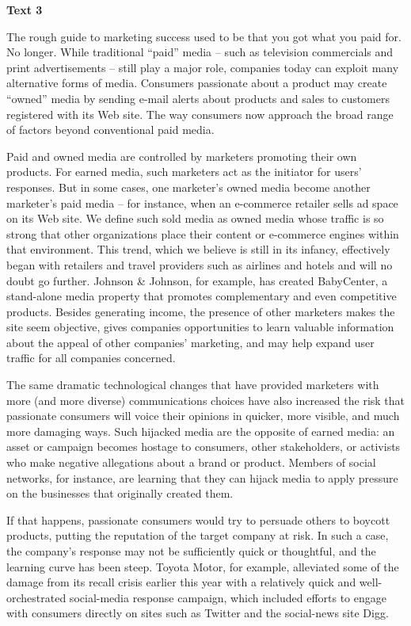 \begin{center}\textbf{Text 3}\end{center}

The rough guide to marketing success used to be that you got what you paid for. No longer. While traditional ``paid'' media – such as television commercials and print advertisements – still play a major role, companies today can exploit many alternative forms of media. Consumers passionate about a product may create ``owned'' media by sending e-mail alerts about products and sales to customers registered with its Web site. The way consumers now approach the broad range of factors beyond conventional paid media.

Paid and owned media are controlled by marketers promoting their own products. For earned media, such marketers act as the initiator for users' responses. But in some cases, one marketer's owned media become another marketer's paid media – for instance, when an e-commerce retailer sells ad space on its Web site. We define such sold media as owned media whose traffic is so strong that other organizations place their content or e-commerce engines within that environment. This trend, which we believe is still in its infancy, effectively began with retailers and travel providers such as airlines and hotels and will no doubt go further. Johnson \& Johnson, for example, has created BabyCenter, a stand-alone media property that promotes complementary and even competitive products. Besides generating income, the presence of other marketers makes the site seem objective, gives companies opportunities to learn valuable information about the appeal of other companies' marketing, and may help expand user traffic for all companies concerned. 

The same dramatic technological changes that have provided marketers with more (and more diverse) communications choices have also increased the risk that passionate consumers will voice their opinions in quicker, more visible, and much more damaging ways. Such hijacked media are the opposite of earned media: an asset or campaign becomes hostage to consumers, other stakeholders, or activists who make negative allegations about a brand or product. Members of social networks, for instance, are learning that they can hijack media to apply pressure on the businesses that originally created them.

If that happens, passionate consumers would try to persuade others to boycott products, putting the reputation of the target company at risk. In such a case, the company's response may not be sufficiently quick or thoughtful, and the learning curve has been steep. Toyota Motor, for example, alleviated some of the damage from its recall crisis earlier this year with a relatively quick and well-orchestrated social-media response campaign, which included efforts to engage with consumers directly on sites such as Twitter and the social-news site Digg.

